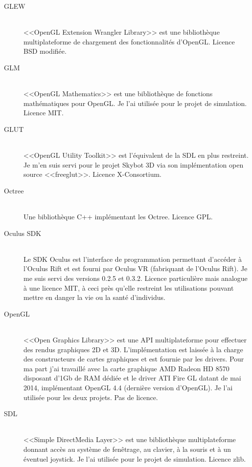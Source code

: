 \documentclass[a4paper,french,12pt]{article}
\begin{document}
		  \begin{description}
		   \item [GLEW]~\\
		      <<OpenGL Extension Wrangler Library>> est une bibliothèque multiplateforme de chargement des fonctionnalités d'OpenGL.
		      Licence BSD modifiée.
		   \item [GLM]~\\
		      <<OpenGL Mathematics>> est une bibliothèque de fonctions mathématiques pour OpenGL.
		      Je l'ai utilisée pour le projet de simulation.
		      Licence MIT.
		   \item [GLUT]~\\
		      <<OpenGL Utility Toolkit>> est l'équivalent de la SDL en plus restreint. Je m'en suis servi pour le 
		      projet Skybot 3D via son implémentation open source <<freeglut>>.
		      Licence X-Consortium.
		   \item [Octree]~\\
		      Une bibliothèque C++ implémentant les Octree.
		      Licence GPL.
		   \item [Oculus SDK]~\\
		      Le SDK Oculus est l'interface de programmation permettant d'accéder à l'Oculus Rift et est fourni
		      par Oculus VR (fabriquant de l'Oculus Rift). 
		      Je me suis servi des versions 0.2.5 et 0.3.2.
		      Licence particulière mais analogue à une licence MIT, à ceci près qu'elle restreint les utilisations
		      pouvant mettre en danger la vie ou la santé d'individus.
		   \item [OpenGL] ~\\
		      <<Open Graphics Library>> est une API multiplateforme pour effectuer des rendus graphiques 2D et 3D.
		      L'implémentation est laissée à la charge des constructeurs de cartes graphiques et est fournie
		      par les drivers. Pour ma part j'ai travaillé avec la carte graphique AMD Radeon HD 8570 disposant d'1Gb de RAM dédiée  
		      et le driver ATI Fire GL datant de mai 2014, implémentant OpenGL 4.4 (dernière version d'OpenGL).
		      Je l'ai utilisée pour les deux projets.
		      Pas de licence.
		   \item [SDL]~\\
		      <<Simple DirectMedia Layer>> est une bibliothèque multiplateforme donnant accès au système de fenêtrage,
		      au clavier, à la souris et à un éventuel joystick. Je l'ai utilisée pour le projet de simulation.
		      Licence zlib.      
		  \end{description}
\end{document}
